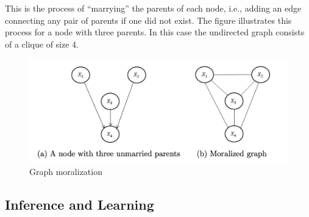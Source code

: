 \documentclass[11pt,a4paper]{article}
\begin{document}
This is the process of “marrying” the parents of each node, i.e., adding an edge connecting any pair of parents if one did not exist. The figure illustrates this process for a node with three parents. In this case the undirected graph consists of a clique of size 4.
\begin{center}\begin{figure}[htbp]
    \centering
    \includegraphics[scale=0.25]{moralization.png}
    \caption{Graph moralization}
    \label{}
\end{figure}\end{center}

\subsection{ Inference and Learning}
\end{document}
